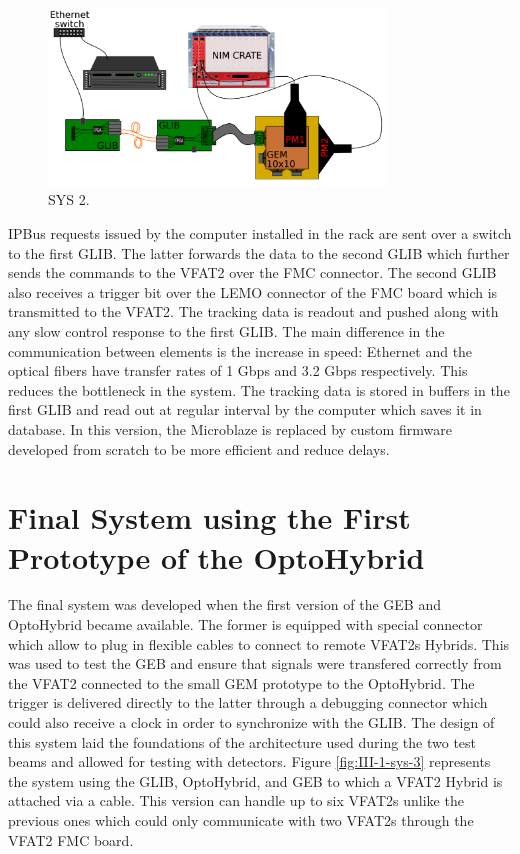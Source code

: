     \begin{figure}[h!]
      \centering
      \includegraphics[width=0.8\textwidth]{img/III-1-arch/sys_2.png}
      \caption{SYS 2.}
      \label{fig:III-1-sys-2}
    \end{figure}

    IPBus requests issued by the computer installed in the rack are sent over a switch to the first GLIB. The latter forwards the data to the second GLIB which further sends the commands to the VFAT2 over the FMC connector. The second GLIB also receives a trigger bit over the LEMO connector of the FMC board which is transmitted to the VFAT2. The tracking data is readout and pushed along with any slow control response to the first GLIB. The main difference in the communication between elements is the increase in speed: Ethernet and the optical fibers have transfer rates of 1 Gbps and 3.2 Gbps respectively. This reduces the bottleneck in the system. The tracking data is stored in buffers in the first GLIB and read out at regular interval by the computer which saves it in database. In this version, the Microblaze is replaced by custom firmware developed from scratch to be more efficient and reduce delays.

  \section{Final System using the First Prototype of the OptoHybrid}

    The final system was developed when the first version of the GEB and OptoHybrid became available. The former is equipped with special connector which allow to plug in flexible cables to connect to remote VFAT2s Hybrids. This was used to test the GEB and ensure that signals were transfered correctly from the VFAT2 connected to the small GEM prototype to the OptoHybrid. The trigger is delivered directly to the latter through a debugging connector which could also receive a clock in order to synchronize with the GLIB. The design of this system laid the foundations of the architecture used during the two test beams and allowed for testing with detectors. Figure \ref{fig:III-1-sys-3} represents the system using the GLIB, OptoHybrid, and GEB to which a VFAT2 Hybrid is attached via a cable. This version can handle up to six VFAT2s unlike the previous ones which could only communicate with two VFAT2s through the VFAT2 FMC board.

